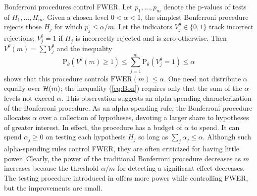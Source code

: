 \documentclass[12pt]{article}
\newcommand{\pr}{\mbox{P}}
\newcommand{\al}{\alpha}
\newcommand{\eqn}[1]{(\ref{#1})}
\begin{document}
Bonferroni procedures control FWER.  Let $p_1, \ldots, p_m$ denote the p-values
of tests of $H_1, \ldots, H_m$.  Given a chosen level $0 < \alpha < 1$,
the simplest Bonferroni procedure rejects those $H_j$ for which $p_j \le
\al/m$.  Let the indicators $V^\theta_j \in \{0, 1\}$ track incorrect
rejections; $V^\theta_j = 1$ if $H_j$ is incorrectly rejected and is
zero otherwise.  Then $V^\theta(m) = \sum V^{\theta}_{j}$ and the
inequality
\begin{equation}
  \pr_\theta(V^\theta(m) \ge 1) 
     \le \sum_{j=1}^m \pr_\theta(V^{\theta}_{j} = 1) \le \al
\label{eq:Bon}
\end{equation}
shows that this procedure controls
$\mbox{FWER}(m) \le \alpha$.  One need not distribute $\alpha$ equally
over ${\cal H}(m)$; the inequality \eqn{eq:Bon} requires only that the
sum of the $\alpha$-levels not exceed $\alpha$.  This observation
suggests an alpha-spending characterization of the Bonferroni
procedure.  As an alpha-spending rule, the Bonferroni procedure
allocates $\alpha$ over a collection of hypotheses, devoting a larger
share to hypotheses of greater interest.  In effect, the procedure has
a budget of $\alpha$ to spend.  It can spend $\alpha_j \ge 0$ on
testing each hypothesis $H_j$ so long as $\sum_j \alpha_j \le \alpha$.
Although such alpha-spending rules control FWER, they are often
criticized for having little power.  Clearly, the power of the
traditional Bonferroni procedure decreases as $m$ increases because
the threshold $\alpha/m$ for detecting a significant effect decreases.
The testing procedure introduced in \citet{holm79} offers more power
while controlling FWER, but the improvements are small.
\end{document}

